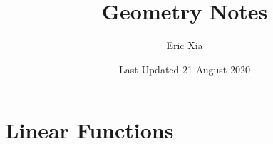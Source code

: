 \documentclass{article}
\title{Geometry Notes}
\author{Eric Xia}
\date{Last Updated 21 August 2020}
\begin{document}
    \maketitle
    \tableofcontents
    \pagebreak

    \section{Linear Functions}
\end{document}
